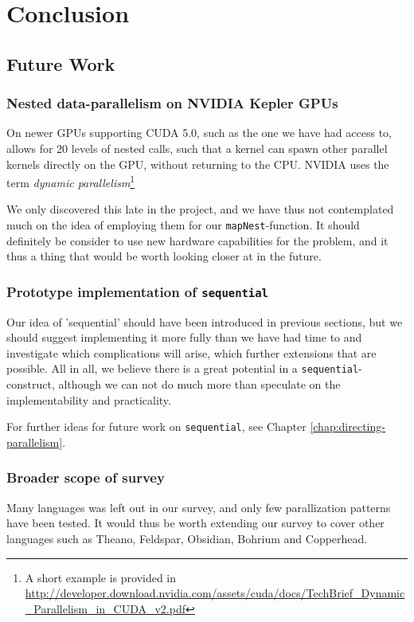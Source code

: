 
\chapter{Conclusion}
\label{chap:Conclusion}
\section{Future Work}


\subsection{Nested data-parallelism on NVIDIA Kepler GPUs}
On newer GPUs supporting CUDA 5.0, such as the one we have had access
to, allows for 20 levels of nested calls, such that a kernel can spawn
other parallel kernels directly on the GPU, without returning to the
CPU. NVIDIA uses the term \emph{dynamic parallelism}\footnote{A short
  example is provided in
  \url{http://developer.download.nvidia.com/assets/cuda/docs/TechBrief_Dynamic_Parallelism_in_CUDA_v2.pdf}}

We only discovered this late in the project, and we have thus not
contemplated much on the idea of employing them for our
\lstinline{mapNest}-function. It should definitely be consider to use
new hardware capabilities for the problem, and it thus a thing that
would be worth looking closer at in the future.

\subsection{Prototype implementation of \texttt{sequential}}
Our idea of 'sequential' should have been introduced in previous
sections, but we should suggest implementing it more fully than we
have had time to and investigate which complications will arise, which
further extensions that are possible. All in all, we believe there is
a great potential in a \texttt{sequential}-construct, although we can
not do much more than speculate on the implementability and
practicality.

For further ideas for future work on \lstinline{sequential}, see
Chapter \ref{chap:directing-parallelism}.

\subsection{Broader scope of survey}
Many languages was left out in our survey, and only few parallization
patterns have been tested. It would thus be worth extending our survey
to cover other languages such as Theano, Feldspar, Obsidian, Bohrium
and Copperhead.

